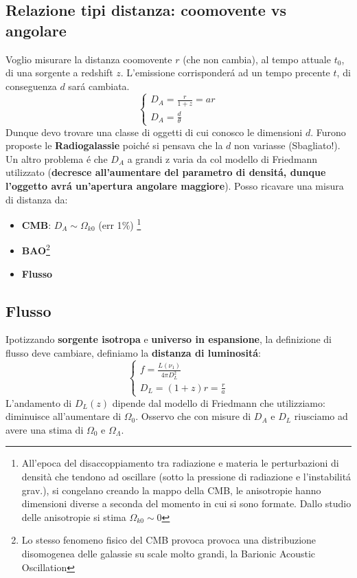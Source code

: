 \documentclass[12pt, a4paper]{article}
\begin{document}
\subsection{Relazione tipi distanza: coomovente vs angolare}
Voglio misurare la distanza coomovente $r$ (che non cambia), al tempo attuale $t_0$, di una sorgente a redshift $z$. L'emissione corrisponder\'{a} ad un tempo precente $t$, di conseguenza $d$ sar\'{a} cambiata.
\begin{equation}
     \begin{cases}
         D_A=\frac{r}{1+z}=ar
         \\
         D_A=\frac{d}{\theta}
     \end{cases}
\end{equation}
Dunque devo trovare una classe di oggetti di cui conosco le dimensioni $d$. Furono proposte le \textbf{Radiogalassie} poich\'{e} si pensava che la $d$ non variasse (Sbagliato!). Un altro problema \'{e} che $D_A$ a grandi z varia da col modello di Friedmann utilizzato (\textbf{decresce all'aumentare del parametro di densit\'{a}, dunque l'oggetto avr\'{a} un'apertura angolare maggiore}). Posso ricavare una misura di distanza da:
\begin{itemize}
    \item \textbf{CMB}: $D_A \sim \Omega_{k0}$ (err 1$\%$) \footnote{All'epoca del disaccoppiamento tra radiazione e materia le perturbazioni di densità che tendono ad oscillare (sotto la pressione di radiazione e l'instabilit\'{a} grav.), si congelano creando la mappo della CMB, le anisotropie hanno dimensioni diverse a seconda del momento in cui si sono formate. Dallo studio delle anisotropie si stima $\Omega_{k0}\sim 0$}
    \item \textbf{BAO}\footnote{Lo stesso fenomeno fisico del CMB provoca provoca una distribuzione disomogenea delle galassie su scale molto grandi, la Barionic Acoustic Oscillation}
    \item \textbf{Flusso}
\end{itemize}
\subsection{Flusso}
Ipotizzando \textbf{sorgente isotropa} e \textbf{universo in espansione}, la definizione di flusso deve cambiare, definiamo la \textbf{distanza di luminosit\'{a}}:
\begin{equation}
     \begin{cases}
         f=\frac{L(\nu_1)}{4 \pi D_L^2}
         \\
         D_L=(1+z)r=\frac{r}{a}
     \end{cases}
\end{equation}
L'andamento di $D_L(z)$ dipende dal modello di Friedmann che utilizziamo: diminuisce all'aumentare di $\Omega_0$. Osservo che con misure di $D_A$ e $D_L$ riusciamo ad avere una stima di $\Omega_0$ e $\Omega_\Lambda$.
\end{document}
